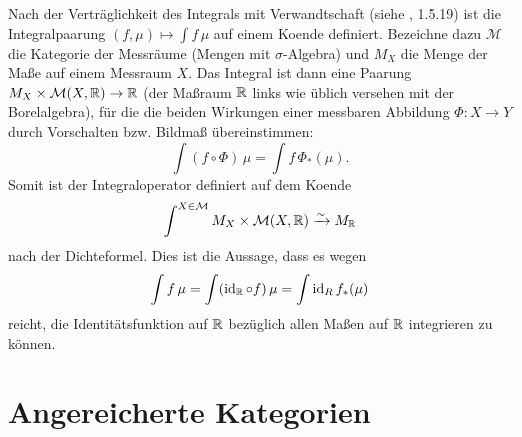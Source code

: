 \begin{bsp}
  Nach der Verträglichkeit des Integrals mit Verwandtschaft (siehe
  \cite{AN3}, 1.5.19) ist die Integralpaarung $(f, \mu) \mapsto \int f
  \, \mu$ auf einem Koende definiert. Bezeichne dazu $\mathcal{M}$ die
  Kategorie der Messräume (Mengen mit $\sigma$-Algebra) und $M_X$ die
  Menge der Maße auf einem Messraum $X$. Das Integral ist dann eine
  Paarung $M_X \times \mathcal{M}(X, \mathbb{R}) \to \mathbb{R}$ (der Maßraum $\mathbb{R}$
  links wie üblich versehen mit der Borelalgebra), für die die beiden
  Wirkungen einer messbaren Abbildung $\Phi: X \to Y$ durch
  Vorschalten bzw. Bildmaß übereinstimmen:
  \[ \int (f \circ \Phi) \, \mu = \int f \, \Phi_*(\mu). \]
  Somit ist der Integraloperator definiert auf dem Koende
  \[ \int^{X \in \mathcal{M}} M_X \times \mathcal{M}(X, \mathbb{R}) \xrightarrow[]{\sim} M_{\mathbb{R}} \]
  nach der Dichteformel. Dies ist die Aussage, dass es wegen
  \[ \int f \, \mu = \int (\operatorname{id}_{\mathbb{R}} \circ f) \, \mu = \int \operatorname{id}_R f_*(\mu) \]
  reicht, die Identitätsfunktion auf $\mathbb{R}$ bezüglich allen Maßen auf
  $\mathbb{R}$ integrieren zu können.
\end{bsp}

\section{Angereicherte Kategorien}
\label{sec:enriched}

